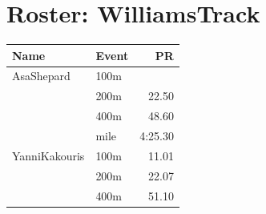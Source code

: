 \documentclass[11pt]{article}
\begin{document}
\section*{Roster: WilliamsTrack}
\begin{tabularx}{\textwidth}{lXr}
\toprule
\textbf{Name} & \textbf{Event} & \textbf{PR} \\
\midrule
AsaShepard & 100m &  \\
& 200m & 22.50 \\
& 400m & 48.60 \\
& mile & 4:25.30 \\
\midrule
YanniKakouris & 100m & 11.01 \\
& 200m & 22.07 \\
& 400m & 51.10 \\
\midrule
\bottomrule
\end{tabularx}
\end{document}
